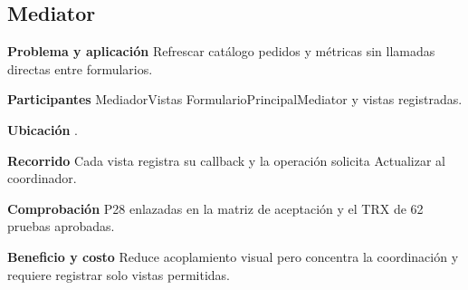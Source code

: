 \noindent\begin{minipage}{\linewidth}
\subsection{Mediator}
\textbf{Problema y aplicación} Refrescar catálogo pedidos y métricas sin llamadas directas entre formularios.

\textbf{Participantes} MediadorVistas FormularioPrincipalMediator y vistas registradas.

\textbf{Ubicación} \href{https://github.com/Alan77-bot/LogiMarket360Alan/blob/68bda51063441415524ede51bdf61649ee9b4973/LogiMarket.Application/Eventos/MediadorVistas.cs#L8}{}.

\textbf{Recorrido} Cada vista registra su callback y la operación solicita Actualizar al coordinador.


\textbf{Comprobación} P28 enlazadas en la matriz de aceptación y el TRX de 62 pruebas aprobadas.

\textbf{Beneficio y costo} Reduce acoplamiento visual pero concentra la coordinación y requiere registrar solo vistas permitidas.

\end{minipage}\par\smallskip
